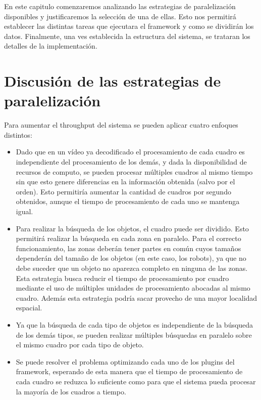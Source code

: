 
En este capitulo comenzaremos analizando las estrategias de paralelización
disponibles y justificaremos la selección de una de ellas. Esto nos permitirá
establecer las distintas tareas que ejecutara el framework y como se dividirán
los datos. Finalmente, una ves establecida la estructura del sistema, se
trataran los detalles de la implementación.

\label{descripcionSistema}

\section{Discusión de las estrategias de paralelización}

Para aumentar el throughput del sistema se pueden aplicar cuatro enfoques distintos:

\begin{itemize}

	\item	Dado que en un vídeo ya decodificado el procesamiento de cada
		cuadro es independiente del procesamiento de los demás, y dada
		la disponibilidad de recursos de computo, se pueden procesar
		múltiples cuadros al mismo tiempo sin que esto genere
		diferencias en la información obtenida (salvo por el orden).
		Esto permitiría aumentar la cantidad de cuadros por segundo
		obtenidos, aunque el tiempo de procesamiento de cada uno se
		mantenga igual.

	\item	Para realizar la búsqueda de los objetos, el cuadro puede ser
		dividido. Esto permitirá realizar la búsqueda en cada zona en
		paralelo. Para el correcto funcionamiento, las zonas deberán
		tener partes en común cuyos tamaños dependerán del tamaño de los
		objetos (en este caso, los robots), ya que no debe suceder que
		un objeto no aparezca completo en ninguna de las zonas. Esta
		estrategia busca reducir el tiempo de procesamiento por cuadro
		mediante el uso de múltiples unidades de procesamiento abocadas
		al mismo cuadro. Además esta estrategia podría sacar provecho de
		una mayor localidad espacial.

	\item	Ya que la búsqueda de cada tipo de objetos es independiente de
		la búsqueda de los demás tipos, se pueden realizar múltiples
		búsquedas en paralelo sobre el mismo cuadro por cada tipo de
		objeto.

	\item	Se puede resolver el problema optimizando cada uno de los
		plugins del framework, esperando de esta manera que el tiempo de
		procesamiento de cada cuadro se reduzca lo suficiente como para
		que el sistema pueda procesar la mayoría de los cuadros a
		tiempo.

\end{itemize}

